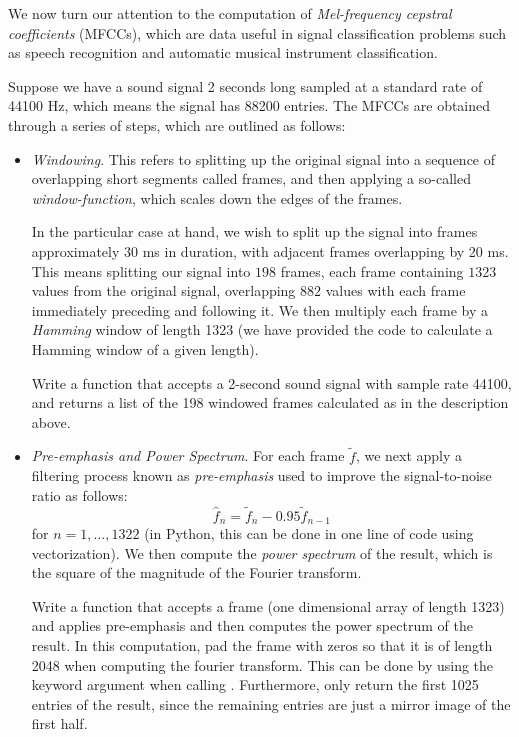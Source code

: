 We now turn our attention to the computation of \emph{Mel-frequency cepstral coefficients} (MFCCs), which
are data useful in signal classification problems such as
speech recognition and automatic musical instrument classification.

Suppose we have a sound signal 2 seconds long sampled at a standard rate of 44100 Hz, which means the
signal has 88200 entries. The  MFCCs are obtained through a series of steps, which are outlined
as follows:
\begin{itemize}
\item \emph{Windowing}. This refers to splitting up the original signal into a sequence of overlapping
short segments called frames, and then applying a so-called \emph{window-function}, which scales down
the edges of the frames.

In the particular case at hand, we wish to split up the signal into frames approximately 30 ms in 
duration, with adjacent frames overlapping by 20 ms. This means splitting our signal into $198$ frames, each frame containing $1323$ values from the original signal, overlapping $882$ values with each frame immediately preceding and following it. We then multiply each frame by a \emph{Hamming} window of length
1323 (we have provided the code to calculate a Hamming window of a given length).


\begin{problem}
Write a function  that accepts a 2-second sound signal with sample rate 44100, and
returns a list of the 198 windowed frames calculated as in the description above.
\end{problem}

\item \emph{Pre-emphasis and Power Spectrum}. For each frame $\tilde{f}$, we next apply 
a filtering process known as \emph{pre-emphasis} used to improve the signal-to-noise ratio as follows:
\begin{equation*}
\widehat{f}_{n} = \tilde{f}_{n} - 0.95 \tilde{f}_{n-1}
\end{equation*}
for $n = 1,\ldots,1322$ (in Python, this can be done in one line of code using vectorization).
We then compute the \emph{power spectrum} of the result, which is the square of the magnitude of the
Fourier transform. 

\begin{problem}
Write a function  that accepts a frame (one dimensional array of length 1323) and 
applies pre-emphasis and then computes the power spectrum of the result. In this computation,
pad the frame with zeros so that it is of length 2048 when computing the fourier transform. This
can be done by using the keyword argument  when calling
. Furthermore, only return the first 1025 entries of the result,
since the remaining entries are just a mirror image of the first half.
\end{problem}


\end{itemize}
